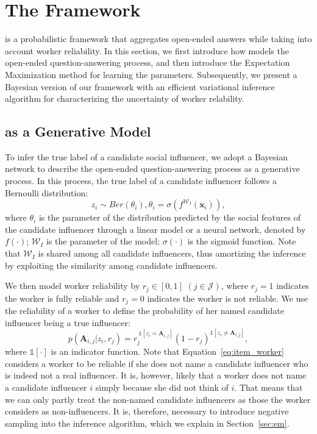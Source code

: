 \section{The \sys Framework}

\sys is a probabilistic framework that aggregates open-ended answers while taking into account worker reliability. In this section, we first introduce how \sys models the open-ended question-answering process, and then introduce the Expectation Maximization method for learning the parameters. Subsequently, we present a Bayesian version of our framework with an efficient variational inference algorithm for characterizing the uncertainty of worker relability. 

\subsection{\sys as a Generative Model}
To infer the true label of a candidate social influencer, we adopt a Bayesian network to describe the open-ended question-answering process as a generative process. In this process, the true label of a candidate influencer follows a Bernoulli distribution:
%
\begin{equation}
    z_i \sim Ber(\theta_i), \theta_i  = \sigma (f^{\mathcal{W}_I}(\mathbf{x}_i)),
    \label{eq:dis_item}
\end{equation}
%
where $\theta_i$ is the parameter of the distribution predicted by the social features of the candidate influencer through a linear model or a neural network, denoted by $f(\cdot)$; $\mathcal{W}_I$ is the parameter of the model; $\sigma(\cdot)$ is the sigmoid function. Note that $\mathcal{W}_I$ is shared among all candidate influencers, thus amortizing the inference \cite{gershman2014amortized} by exploiting the similarity among candidate influencers. 


We then model worker reliability by $r_j \in [0,1]$ $(j\in \mathcal{J})$, where $r_j=1$ indicates the worker is fully reliable and $r_j=0$ indicates the worker is not reliable. We use the reliability of a worker to define the probability of her named candidate influencer being a true influencer:
%
\begin{equation}
    p(\mathbf{A}_{i,j} | z_i,  r_j) = r_j^{\ \mathds{1}[z_i=\mathbf{A}_{i,j}]} (1- r_j)^{\mathds{1}[z_i\ne \mathbf{A}_{i,j}]},
    \label{eq:item_worker}
\end{equation}
%
where $\mathds{1}[\cdot]$ is an indicator function. Note that Equation~\ref{eq:item_worker} considers a worker to be reliable if she does not name a candidate influencer who is indeed not a real influencer. It is, however, likely that a worker does not name a candidate influencer $i$ simply because she did not think of $i$. That means that we can only partly treat the non-named candidate influencers as those the worker considers as non-influencers. It is, therefore, necessary to introduce negative sampling into the inference algorithm, which we explain in Section~\ref{sec:em}. 

